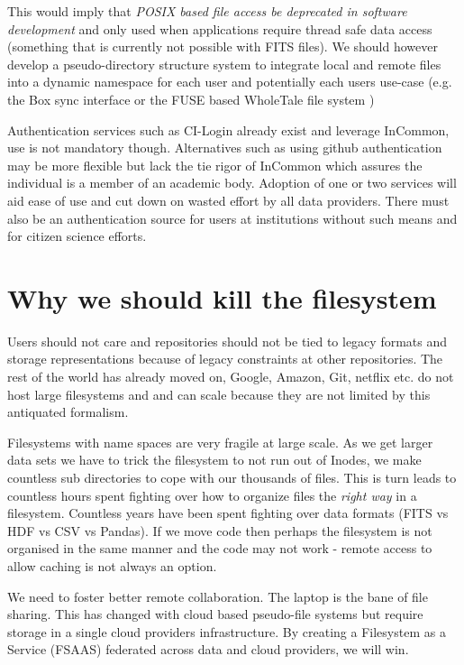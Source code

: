 This would imply that \emph{POSIX based file access be deprecated
in software development} and only used when applications require thread safe
data access (something that is currently not possible with \gls{FITS} files).
We should however  develop a pseudo-directory structure system to
integrate local and remote files into a dynamic namespace for each user and potentially
each users use-case (e.g. the Box sync interface or the \gls{FUSE} based WholeTale file system
\citep{BRINCKMAN2019854})

Authentication services such as CI-Login already exist and leverage InCommon, use is not mandatory though. Alternatives such as using github authentication may be more flexible but lack the tie rigor of InCommon which assures the individual is a member of an academic body.
Adoption of one or two services will  aid ease of use and cut down on wasted effort by all data providers.
There must also be an authentication source for users at institutions without such means and for citizen science efforts.

\section{Why we should kill the filesystem}

Users should not care and repositories should not be tied to legacy formats  and storage representations because of legacy constraints  at other repositories.
The rest of the world has already moved on,  Google, Amazon, Git, netflix etc. do not host large filesystems and and can scale because they are not limited by this antiquated formalism.


Filesystems with name spaces are very fragile at large scale. As we get larger data sets we have to trick the filesystem to not run out of Inodes, we make countless sub directories to cope with our thousands of files.
This is turn leads to countless hours spent fighting over how to organize files  the \emph{right way} in a filesystem.
Countless years have been spent fighting over data formats (\gls{FITS} vs \gls{HDF} vs \gls{CSV} vs Pandas).
If we move code then perhaps the filesystem is not organised in the same manner and the code may not work - remote access to allow caching is not always an option.

We need to foster better remote collaboration.  The laptop is the bane of file sharing.
This has changed with cloud based pseudo-file systems but require storage in a single
cloud providers infrastructure. By creating a Filesystem as a Service (\gls{FSAAS}) federated
across data and cloud providers, we will win.



